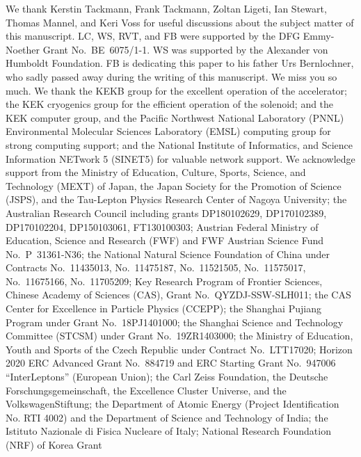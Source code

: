 \documentclass[twocolumn,aps,prd,superscriptaddress,nofootinbib,floatfix,preprintnumbers,a4]{revtex4-1}
\begin{document}
\acknowledgments

We thank Kerstin Tackmann, Frank Tackmann, Zoltan Ligeti, Ian Stewart, Thomas Mannel, and Keri Voss for useful discussions about the subject matter of this manuscript. LC, WS, RVT, and FB were supported by the DFG Emmy-Noether Grant No.\ BE~6075/1-1. WS was supported by the Alexander von Humboldt Foundation. FB is dedicating this paper to his father Urs Bernlochner, who sadly passed away during the writing of this manuscript. We miss you so much. We thank the KEKB group for the excellent operation of the
accelerator; the KEK cryogenics group for the efficient
operation of the solenoid; and the KEK computer group, and the Pacific Northwest National
Laboratory (PNNL) Environmental Molecular Sciences Laboratory (EMSL)
computing group for strong computing support; and the National
Institute of Informatics, and Science Information NETwork 5 (SINET5) for
valuable network support.  We acknowledge support from
the Ministry of Education, Culture, Sports, Science, and
Technology (MEXT) of Japan, the Japan Society for the 
Promotion of Science (JSPS), and the Tau-Lepton Physics 
Research Center of Nagoya University; 
the Australian Research Council including grants
DP180102629, %
DP170102389, %
DP170102204, %
DP150103061, %
FT130100303; %
Austrian Federal Ministry of Education, Science and Research (FWF) and
FWF Austrian Science Fund No.~P~31361-N36;
the National Natural Science Foundation of China under Contracts
No.~11435013,  %
No.~11475187,  %
No.~11521505,  %
No.~11575017,  %
No.~11675166,  %
No.~11705209;  %
Key Research Program of Frontier Sciences, Chinese Academy of Sciences (CAS), Grant No.~QYZDJ-SSW-SLH011; %
the  CAS Center for Excellence in Particle Physics (CCEPP); %
the Shanghai Pujiang Program under Grant No.~18PJ1401000;  %
the Shanghai Science and Technology Committee (STCSM) under Grant No.~19ZR1403000; %
the Ministry of Education, Youth and Sports of the Czech
Republic under Contract No.~LTT17020;
Horizon 2020 ERC Advanced Grant No.~884719 and ERC Starting Grant No.~947006 ``InterLeptons'' (European Union);
the Carl Zeiss Foundation, the Deutsche Forschungsgemeinschaft, the
Excellence Cluster Universe, and the VolkswagenStiftung;
the Department of Atomic Energy (Project Identification No. RTI 4002) and the Department of Science and Technology of India; 
the Istituto Nazionale di Fisica Nucleare of Italy; 
National Research Foundation (NRF) of Korea Grant
\end{document}
